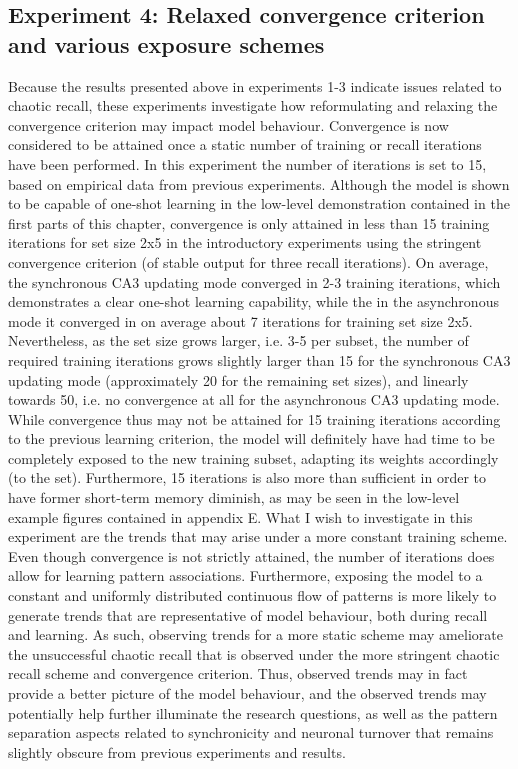 \subsection{Experiment 4: Relaxed convergence criterion and various exposure schemes}

Because the results presented above in experiments 1-3 indicate issues related to chaotic recall, these experiments investigate how reformulating and relaxing the convergence criterion may impact model behaviour. Convergence is now considered to be attained once a static number of training or recall iterations have been performed. In this experiment the number of iterations is set to 15, based on empirical data from previous experiments. Although the model is shown to be capable of one-shot learning in the low-level demonstration contained in the first parts of this chapter, convergence is only attained in less than 15 training iterations for set size 2x5 in the introductory experiments using the stringent convergence criterion (of stable output for three recall iterations). On average, the synchronous CA3 updating mode converged in 2-3 training iterations, which demonstrates a clear one-shot learning capability, while the in the asynchronous mode it converged in on average about 7 iterations for training set size 2x5. 
%
Nevertheless, as the set size grows larger, i.e. 3-5 per subset, the number of required training iterations grows slightly larger than 15 for the synchronous CA3 updating mode (approximately 20 for the remaining set sizes), and linearly towards 50, i.e. no convergence at all for the asynchronous CA3 updating mode.
While convergence thus may not be attained for 15 training iterations according to the previous learning criterion, the model will definitely have had time to be completely exposed to the new training subset, adapting its weights accordingly (to the set). Furthermore, 15 iterations is also more than sufficient in order to have former short-term memory diminish, as may be seen in the low-level example figures contained in appendix E.
What I wish to investigate in this experiment are the trends that may arise under a more constant training scheme. Even though convergence is not strictly attained, the number of iterations does allow for learning pattern associations. Furthermore, exposing the model to a constant and uniformly distributed continuous flow of patterns is more likely to generate trends that are representative of model behaviour, both during recall and learning. As such, observing trends for a more static scheme may ameliorate the unsuccessful chaotic recall that is observed under the more stringent chaotic recall scheme and convergence criterion. Thus, observed trends may in fact provide a better picture of the model behaviour, and the observed trends may potentially help further illuminate the research questions, as well as the pattern separation aspects related to synchronicity and neuronal turnover that remains slightly obscure from previous experiments and results.

